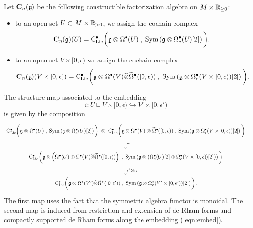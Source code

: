 \documentclass[11pt]{amsart}
\numberwithin{equation}{section}
\def\brian{\textcolor{blue}{BW: }\textcolor{blue}}
\begin{document}
\begin{dfn}
\label{dfn:constructible1}
Let $\mathbf C_n(\mathfrak g)$ be the following constructible factorization algebra on $M \times \mathbb R_{\geq 0}$:
\begin{itemize}
\item to an open set $U \subset M \times \mathbb R_{> 0}$, we assign the cochain complex 
\[
\mathbf C_n (\mathfrak g) (U) = {\rm C}_{\rm Lie}^\bullet \bigg(\mathfrak g \otimes \Omega^\bullet (U) \; , \; {\rm Sym} \left(\mathfrak g \otimes \Omega^\bullet_c(U) [2] \right) \bigg) .
\]
\item to an open set $V \times [0,\epsilon)$ we assign the cochain complex 
\[
\mathbf C_n (\mathfrak g) (V \times [0,\epsilon)) = {\rm C}_{\rm Lie}^\bullet\bigg(\mathfrak g \otimes \Omega^\bullet(V) \widehat{\otimes} \widetilde{\Omega}^\bullet([0,\epsilon))  \; , \; {\rm Sym}\left(\mathfrak g \otimes \Omega^\bullet_c (V \times [0,\epsilon))[2] \right) \bigg).
\]
\end{itemize}
The structure map associated to the embedding 
\begin{equation}\label{eqn:embed}
i : U \sqcup V \times [0, \epsilon) \hookrightarrow V' \times [0,\epsilon')
\end{equation}
is given by the composition
\[
\begin{tikzcd}
\clies \bigg(\fg \otimes \Omega^\bu (U) \; , \; \Sym \left(\fg \otimes \Omega^\bu_c(U) [2] \right) \bigg) \; \otimes \;  \clies\bigg(\fg \otimes \Omega^\bu(V) \otimes \Tilde{\Omega}^\bu([0,\epsilon))  \; , \; \Sym\left(\fg \otimes \Omega^\bu_c (V \times [0,\epsilon))[2] \right) \bigg) \ar[d, "\simeq"] \\
\clies \bigg(\fg \otimes \left(\Omega^\bu (U) \oplus \Omega^\bu(V) \Hat{\otimes} \Tilde{\Omega}^\bu([0,\epsilon)) \right) \; , \; \Sym \left(\fg \otimes \left(\Omega^\bu_c(U) [2] \oplus \Omega^\bu_c(V \times [0,\epsilon)) [2]\right)\right) \bigg) \ar[d, "i^* \otimes i_*"] \\
\clies\bigg(\fg \otimes \Omega^\bu(V') \Hat{\otimes} \Tilde{\Omega}^\bu([0,\epsilon'))  \; , \; \Sym\left(\fg \otimes \Omega^\bu_c (V' \times [0,\epsilon'))[2] \right) \bigg).
\end{tikzcd}
\]
The first map uses the fact that the symmetric algebra functor is monoidal. 
The second map is induced from restriction and extension of de Rham forms and compactly supported de Rham forms along the embedding (\ref{eqn:embed}). 
\end{dfn}
\end{document}
